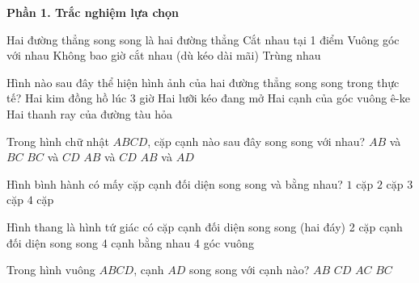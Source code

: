 \textbf{Phần 1. Trắc nghiệm lựa chọn}

\begin{ex} %
Hai đường thẳng song song là hai đường thẳng
\choice
{Cắt nhau tại 1 điểm}
{Vuông góc với nhau}
{\True Không bao giờ cắt nhau (dù kéo dài mãi)}
{Trùng nhau}
\end{ex}

\begin{ex} %
Hình nào sau đây thể hiện hình ảnh của hai đường thẳng song song trong thực tế?
\choice
{Hai kim đồng hồ lúc 3 giờ}
{Hai lưỡi kéo đang mở}
{Hai cạnh của góc vuông ê-ke}
{\True Hai thanh ray của đường tàu hỏa}
\end{ex}

\begin{ex} %
Trong hình chữ nhật $ABCD$, cặp cạnh nào sau đây song song với nhau?
\choice
{$AB$ và $BC$}
{$BC$ và $CD$}
{\True $AB$ và $CD$}
{$AB$ và $AD$}
\end{ex}

\begin{ex} %
Hình bình hành có mấy cặp cạnh đối diện song song và bằng nhau?
\choice
{$1$ cặp}
{\True $2$ cặp}
{$3$ cặp}
{$4$ cặp}
\end{ex}

\begin{ex} %
Hình thang là hình tứ giác có
\choice
{ cặp cạnh đối diện song song (hai đáy)}
{2 cặp cạnh đối diện song song}
{4 cạnh bằng nhau}
{4 góc vuông}
\end{ex}

\begin{ex} %
Trong hình vuông $ABCD$, cạnh $AD$ song song với cạnh nào?
\choice
{$AB$}
{$CD$}
{$AC$}
{\True $BC$}
\end{ex}

